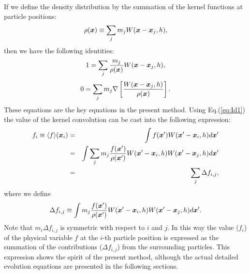 \documentclass{cjour}
\newcommand{ \Vec   }[1]{ \mbox{\boldmath $ #1 $} }
\begin{document}
\begin{article}
If we define the density distribution by the summation of 
the kernel functions at particle positions: 
\begin{equation}
                 \rho(\Vec{x}) \equiv 
                 \sum_{j} m_j W(\Vec{x} - \Vec{x}_{j} , h ), 
                                                    \label{eq:Dsph}
\end{equation}
then we have the following identities: 
\begin{equation}
               1 = \sum_{j} \frac{m_j}{\rho(\Vec{x})} 
                              W(\Vec{x} - \Vec{x}_{j} , h ) , 
                                                     \label{eq:Id1}
\end{equation}
\begin{equation}
               0 = \sum_{j} m_{j} 
                   \nabla 
                   \left[
                   \frac{ W(\Vec{x}-\Vec{x}_{j},h) }{ \rho(\Vec{x}) }
                   \right] .
                                                       \label{eq:Id2}
\end{equation}
These equations are the key equations in the present method. 
Using Eq.(\ref{eq:Id1}) 
the value of the kernel convolution can be cast into 
the following expression: 
\begin{eqnarray}
    f_i \equiv \langle f \rangle (\Vec{x}_i) 
    & = &  \int f(\Vec{x}') W(\Vec{x}'-\Vec{x}_i,h) d\Vec{x}'
                                                          \nonumber \\ 
    & = &  \int \sum_j m_j \frac{ f(\Vec{x}') }{\rho(\Vec{x}')} 
                W(\Vec{x}'-\Vec{x}_i,h) 
                W(\Vec{x}'-\Vec{x}_j,h) d\Vec{x}'
                                                          \nonumber \\ 
    & = &   \sum_j \Delta f_{i,j}, 
                                                     \label{eq:convn}
\end{eqnarray}
where we define 
\begin{equation}
     \Delta f_{i,j} \equiv 
           \int m_j \frac{ f(\Vec{x}') }{\rho(\Vec{x}')} 
                W(\Vec{x}'-\Vec{x}_i,h) 
                W(\Vec{x}'-\Vec{x}_j,h) d\Vec{x}' .
                                                     \label{eq:fij}
\end{equation}
Note that $m_i \Delta f_{i,j}$ is symmetric 
with respect to $i$ and $j$. 
In this way the value ($f_i$) of the physical variable $f$ at the 
$i$-th particle position is expressed as the summation of 
the contributions ($\Delta f_{i,j}$) from the surrounding particles.  
This expression shows the spirit of the present method, 
although the actual detailed evolution equations are presented 
in the following sections. 


\end{article}
\end{document}
